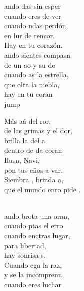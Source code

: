 \begin{cancion}%
	ando das sin esper\\
	cuando eres de ver\\
	cuando ndas perdón,\\
	en lur de rencor,\\
	Hay  en tu corazón.\\
	ando sientes compasn\\
	de un ao y su do\\
	cuando as la estrella,\\
	que olta la niebla,\\
	hay  en tu coran\\jump\\
	\begin{chorus}%
	Más aá del ror,\\
	de las grimas y el dor, \\
	brilla la  del a\\
	dentro de da coran\\
	Ilusn, Navi, \\
	pon tus eños a var.\\
	Siembra , brinda a,\\
	que el mundo enro pide .\\
	\end{chorus}%
	\jump\\
	ando brota una oran, \\
	cuando ptas el erro\\
	cuando enctras lugar,\\
	para  libertad,\\
	hay  sonrisa s.\\
	Cuando ega la raz,\\
	y se la incomprenn,\\
	cuando eres luchar\\

\end{cancion}
